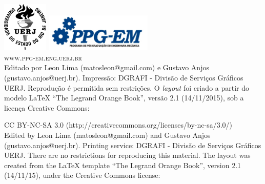 \documentclass[11pt,a4paper]{book} %
\begin{document}
\vspace*{4cm}


\newpage
~\vfill
\thispagestyle{empty}

\noindent
\includegraphics[height=24mm]{Pictures/logo_uerj_PB.png}
\hspace{2cm}
\includegraphics[height=18mm]{Pictures/logo_ppg-em.jpg}\\



\noindent \textsc{www.ppg-em.eng.uerj.br}\\ %

\noindent Editado por Leon Lima (matosleon@gmail.com) e Gustavo Anjos
(gustavo.anjos@uerj.br). Impressão: DGRAFI - Divisão de Serviços
Gráficos UERJ. Reprodução é permitida sem restrições. O {\it layout} foi
criado a partir do modelo {\LaTeX} ``The Legrand Orange Book'', versão
2.1 (14/11/2015), sob a licença Creative Commons:

CC BY-NC-SA 3.0 (http://creativecommons.org/licenses/by-nc-sa/3.0/)\\ %

\noindent Edited by Leon Lima (matosleon@gmail.com) and Gustavo Anjos
(gustavo.anjos@uerj.br). Printing service: DGRAFI - Divisão de Serviços
Gráficos UERJ. There are no restrictions for reproducing this material.
The layout was created from the {\LaTeX} template ``The Legrand Orange
Book'', version 2.1 (14/11/15), under the Creative Commons license: 
\end{document}
